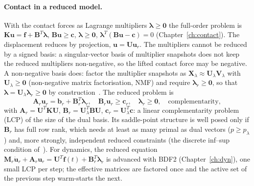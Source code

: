 \paragraph{Contact in a reduced model.}
With the contact forces as Lagrange multipliers $\bm\lambda\ge\bm0$ the full-order problem is $\bm K\bm u=\bm f+\bm B^T\bm\lambda$, $\bm B\bm u\ge\bm c$, $\bm\lambda\ge\bm 0$, $\bm\lambda^T(\bm B\bm u-\bm c)=0$ (Chapter~\ref{ch:contact}). The displacement reduces by projection, $\bm u=\bm U\bm u_r$. The multipliers cannot be reduced by a signed basis: a singular-vector basis of multiplier snapshots does not keep the reduced multipliers non-negative, so the lifted contact force may be negative. A non-negative basis does: factor the multiplier snapshots as $\bm X_\lambda\approx\bm U_\lambda\bm V_\lambda$ with $\bm U_\lambda\ge\bm0$ (non-negative matrix factorisation, NMF) and require $\bm\lambda_r\ge\bm0$, so that $\bm\lambda=\bm U_\lambda\bm\lambda_r\ge\bm0$ by construction~\cite{balajewicz2016contact}. The reduced problem is
\begin{equation}\label{eq:hy-redcontact}
\bm A_r\bm u_r=\bm b_r+\bm B_r^T\bm\lambda_r,\quad \bm B_r\bm u_r\ge\bm c_r,\quad\bm\lambda_r\ge\bm0,\quad\text{complementarity},
\end{equation}
with $\bm A_r=\bm U^T\bm K\bm U$, $\bm B_r=\bm U_\lambda^T\bm B\bm U$, $\bm c_r=\bm U_\lambda^T\bm c$: a linear complementarity problem (LCP) of the size of the dual basis. Its saddle-point structure is well posed only if $\bm B_r$ has full row rank, which needs at least as many primal as dual vectors ($p\ge p_\lambda$) and, more strongly, independent reduced constraints (the discrete inf--sup condition of~\cite{fauque2018hybrid}). For dynamics, the reduced equation $\bm M_r\ddot{\bm u}_r+\bm A_r\bm u_r=\bm U^T\bm f(t)+\bm B_r^T\bm\lambda_r$ is advanced with BDF2 (Chapter~\ref{ch:dyn}), one small LCP per step; the effective matrices are factored once and the active set of the previous step warm-starts the next.


